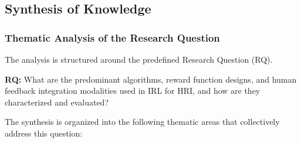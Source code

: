 \documentclass[rnd]{mas_proposal}
\begin{document}
\subsection{Synthesis of Knowledge}
\subsubsection{Thematic Analysis of the Research Question}
The analysis is structured around the predefined Research Question (RQ).

\textbf{RQ:} What are the predominant algorithms, reward function designs,
and human feedback integration modalities used in IRL for HRI, and how
are they characterized and evaluated?

The synthesis is organized into the following thematic areas that collectively address this question:
\end{document}
